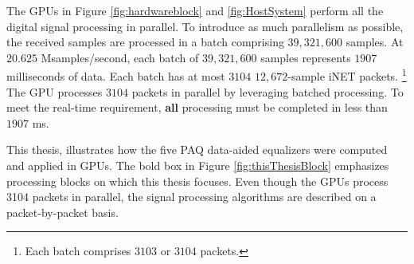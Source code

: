 
%

The GPUs in Figure \ref{fig:hardwareblock} and \ref{fig:HostSystem} perform all the digital signal processing in parallel.
To introduce as much parallelism as possible, the received samples are processed in a batch comprising $39{,}321{,}600$ samples. 
At $20.625$ Msamples/second, each batch of $39{,}321{,}600$ samples represents $1907$ milliseconds of data.
Each batch has at most $3104$ $12{,}672$-sample iNET packets.%
\footnote{Each batch comprises $3103$ or $3104$ packets.}
The GPU processes $3104$ packets in parallel by leveraging batched processing.
To meet the real-time requirement, \textbf{all} processing must be completed in less than $1907$ ms.


This thesis, illustrates how the five PAQ data-aided equalizers were computed and applied in GPUs.
The bold box in Figure \ref{fig:thisThesisBlock} emphasizes processing blocks on which this thesis focuses.
Even though the GPUs process 3104 packets in parallel, the signal processing algorithms are described on a
packet-by-packet basis.

